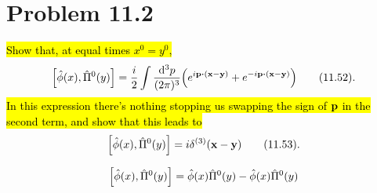 \documentclass{article}
\begin{document}
\section*{Problem 11.2}
\begin{quoting}
    \hl{Show that, at equal times $x^0=y^0$,}\[\bqty{\hat{\phi}(x),\hat{\Pi}^0(y)}=\frac{i}{2}\int\frac{\dd[3]{p}}{(2\pi)^3}\pqty{e^{i\vb{p\vdot(\vb{x}-\vb{y})}}+e^{-i\vb{p\vdot(\vb{x}-\vb{y})}}}\qquad(11.52).\]\hl{In this expression there's nothing stopping us swapping the sign of $\vb{p}$ in the second term, and show that this leads to}\[\bqty{\hat{\phi}(x),\hat{\Pi}^0(y)}=i\delta^{(3)}(\vb{x}-\vb{y})\qquad(11.53).\]
\end{quoting}

\begin{align*}
    \bqty{\hat{\phi}(x),\hat{\Pi}^0(y)} & =\hat{\phi}(x)\hat{\Pi}^0(y)-\hat{\phi}(x)\hat{\Pi}^0(y) \\
\end{align*}
\end{document}

